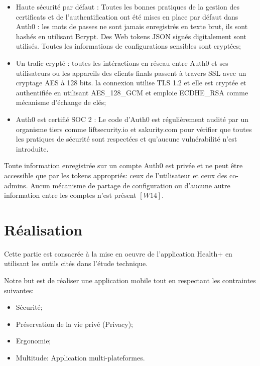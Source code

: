 \begin{itemize}
	\item Haute sécurité par défaut : Toutes les bonnes pratiques de la gestion des certificats et de l'authentification ont été mises en place par défaut dans Auth0 : les mots de passes ne sont jamais enregistrés en texte brut, ils sont hashés en utilisant Bcrypt. Des Web tokens JSON signés digitalement sont utilisés. Toutes les informations de configurations sensibles sont cryptées;
	\item  Un trafic crypté : toutes les intéractions en réseau entre Auth0 et ses utilisateurs ou les appareils des clients finals passent à travers SSL avec un cryptage AES à 128 bits. la connexion utilise TLS 1.2 et elle est cryptée et authentifiée en utilisant AES\_128\_GCM et emploie ECDHE\_RSA comme mécanisme d'échange de clés;
	\item Auth0 est certifié SOC 2 : Le code d'Auth0 est régulièrement audité par un organisme tiers comme liftsecurity.io et sakurity.com pour vérifier que toutes les pratiques de sécurité sont respectées et qu'aucune vulnérabilité n'est introduite.
\end{itemize}

\vspace{6pt}
\paragraphmark

Toute information enregistrée sur un compte Auth0 est privée et ne peut être accessible que par les tokens appropriés: ceux de l'utilisateur et ceux des co-admins. Aucun mécanisme de partage de configuration ou d’aucune autre information entre les comptes n’est présent $[W14]$.

\section{Réalisation}

Cette partie est consacrée à la mise en oeuvre de l'application Health+ en utilisant les outils cités dans l'étude technique.

\vspace{6pt}
\paragraphmark

Notre but est de réaliser une application mobile tout en respectant les contraintes suivantes:

\vspace{6pt}
\paragraphmark

\begin{itemize}
	\item Sécurité;
	\item Préservation de la vie privé (Privacy);
	\item Ergonomie;
	\item Multitude: Application multi-plateformes.
\end{itemize}

